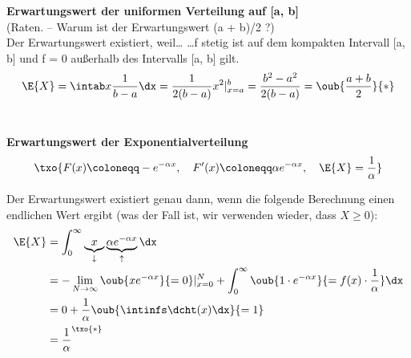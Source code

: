 \begin{bsp}
    \textbf{Erwartungswert der uniformen Verteilung auf [a, b]}   \\
    (Raten.
    – Warum ist der Erwartungswert (a + b)/2 ?) \\
    Der Erwartungswert existiert, weil\ldots
    \ldots f stetig ist auf dem kompakten Intervall [a, b]
    und f = 0 außerhalb des Intervalls [a, b] gilt.
    \[
        \E{X} = \intab x \frac{1}{b-a} \dx = \frac{1}{2(b-a)} x^2 |^b_{x=a} = \frac{b^2 - a^2}{2(b-a)} = \oub{\frac{a+b}{2}}{*}
    \]
     \\
\end{bsp}
\begin{bsp}
    \textbf{Erwartungswert der Exponentialverteilung}   \\
    \[
        \txo{ F(x) \coloneqq - e^{-\alpha x}, \quad F'(x) \coloneqq \alpha e^{-\alpha x}, \quad \E{X} = \frac{1}{\alpha}}
    \]

    Der Erwartungswert existiert genau dann, wenn die folgende Berechnung einen
    endlichen Wert ergibt (was der Fall ist, wir verwenden wieder, dass $X \geq 0$):
    \begin{align*}
        \E{X} & = \int^{\infty}_0 \underbrace{x}_{\downarrow} \underbrace{\alpha e^{- \alpha x}}_{\uparrow} \dx \\
        & = - \lim_{N \rightarrow \infty} \oub{x e^{- \alpha x}}{=0} |^N_{x=0} +  \int^{\infty}_0 \oub{1 \cdot  e^{- \alpha
        x} }{=f(x) \cdot \frac{1}{\alpha}} \dx \\
        & = 0 + \frac{1}{\alpha} \oub{\intinfs \dcht(x) \dx }{=1} \\
        & = \frac{1}{\alpha}^{\txo{*}}
    \end{align*}
    \txc{
        \begin{align*}
            * \dcht(x) & = \alpha e^{- \alpha x} \chi_{[0,\infty)}(x) \\
            \Rightarrow \int_0^{\infty} e^{- \alpha x} \dx
            & = \frac{1}{\alpha} \int_0^{\infty} \alpha e^{- \alpha x} \dx \\
            & = \frac{1}{\alpha}  \intinfs \dcht(x) \dx \\
            & = \frac{1}{\alpha}
        \end{align*}
    }
\end{bsp}

